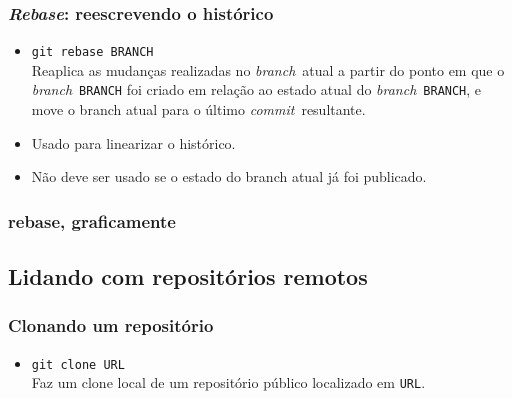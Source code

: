 \documentclass{beamer}
\newcommand{\branch}{\emph{branch}}
\newcommand{\commit}{\emph{commit}}
\begin{document}
\begin{frame}
  \frametitle{\emph{Rebase}: reescrevendo o histórico}
  \begin{itemize}
    \item<1-> \texttt{git rebase BRANCH}\\
      Reaplica as mudanças realizadas no \branch\ atual a partir do
      ponto em que o \branch\ \texttt{BRANCH} foi criado em relação ao
      estado atual do \branch\ \texttt{BRANCH}, e move o branch atual
      para o último \commit\ resultante.
    \item<2-> Usado para linearizar o histórico.
    \item<3-> Não deve ser usado se o estado do branch atual já foi
      publicado.
  \end{itemize}
\end{frame}

\begin{frame}
  \frametitle{rebase, graficamente}
  \begin{figure}[h]
    \begin{center}
    \end{center}
    \label{fig:rebase}
  \end{figure}
\end{frame}

\subsection[Repositórios remotos]{Lidando com repositórios remotos}

\begin{frame}
  \frametitle{Clonando um repositório}
  \begin{itemize}
    \item \texttt{git clone URL}\\
      Faz um clone local de um repositório público localizado em
      \texttt{URL}.
  \end{itemize}
\end{frame}
\end{document}

